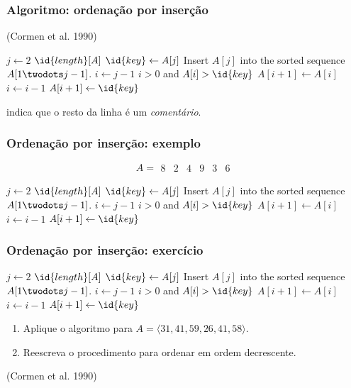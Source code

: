 \documentclass{beamer}
\begin{document}
\begin{frame}

  \frametitle{Algoritmo: ordenação por inserção}

(Cormen et al. 1990)

\begin{codebox}
\li \For $j \gets 2$ \To $\id{length}[A]$
\li     \Do
$\id{key} \gets A[j]$
\li
\Comment Insert $A[j]$ into the sorted sequence
    $A[1 \twodots j-1]$.
\li $i \gets j-1$
\li \While $i > 0$ and $A[i] > \id{key}$
\li    \Do
        $A[i+1] \gets A[i]$
\li     $i \gets i-1$
    \End
\li $A[i+1] \gets \id{key}$
\End
\end{codebox}  
\Comment indica que o resto da linha é um \emph{comentário}.
\end{frame}

\begin{frame}

  \frametitle{Ordenação por inserção: exemplo}

  \[
  A = \begin{array}{cccccc}
8 & 2 & 4 & 9 & 3 & 6
\end{array}
\]


\begin{codebox}
\li \For $j \gets 2$ \To $\id{length}[A]$
\li     \Do
$\id{key} \gets A[j]$
\li
\Comment Insert $A[j]$ into the sorted sequence
    $A[1 \twodots j-1]$.
\li $i \gets j-1$
\li \While $i > 0$ and $A[i] > \id{key}$
\li    \Do
        $A[i+1] \gets A[i]$
\li     $i \gets i-1$
    \End
\li $A[i+1] \gets \id{key}$
\End
\end{codebox}  

\end{frame}

\begin{frame}

  \frametitle{Ordenação por inserção: exercício}

\begin{codebox}
\li \For $j \gets 2$ \To $\id{length}[A]$
\li     \Do
$\id{key} \gets A[j]$
\li
\Comment Insert $A[j]$ into the sorted sequence
    $A[1 \twodots j-1]$.
\li $i \gets j-1$
\li \While $i > 0$ and $A[i] > \id{key}$
\li    \Do
        $A[i+1] \gets A[i]$
\li     $i \gets i-1$
    \End
\li $A[i+1] \gets \id{key}$
\End
\end{codebox}  

\begin{enumerate}
\item Aplique o algoritmo para $A = \langle 31, 41, 59, 26, 41, 58 \rangle$.
\item Reescreva o procedimento  para ordenar em ordem
  decrescente.
\end{enumerate}
(Cormen et al. 1990)

\end{frame}
\end{document}
